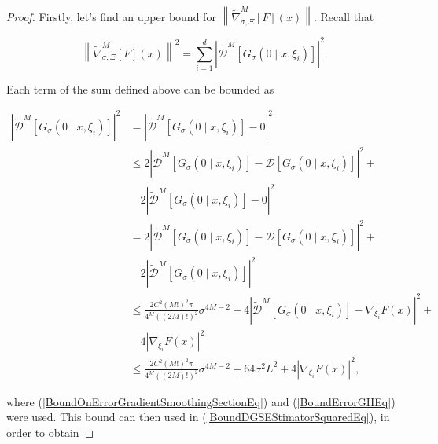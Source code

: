 \begin{proof}

Firstly, let's find an upper bound for $\left\|\widetilde{\nabla}_{\sigma, \Xi}^{M}[F](x)\right\|$. Recall that

\begin{equation}\label{BoundDGSEStimatorSquaredEq}
\left\|\widetilde{\nabla}_{\sigma, \Xi}^{M}[F](x)\right\|^{2} = \sum_{i=1}^d \left|\widetilde{\mathcal{D}}^{M}\left[G_{\sigma}\left(0 \mid x, \xi_{i}\right)\right]\right|^{2}.
\end{equation}

Each term of the sum defined above can be bounded as

\begin{equation}\label{BoundOnErrorEstimationGradientSmoothingSectionEq2}
 \begin{aligned}
 \left|\widetilde{\mathcal{D}}^{M}\left[G_{\sigma}\left(0 \mid x, \xi_{i}\right)\right]\right|^{2} 
 & =  \left|\widetilde{\mathcal{D}}^{M}\left[G_{\sigma}\left(0 \mid x, \xi_{i}\right)\right] - 0 \right|^{2} \\
 & \leq  2\left|\widetilde{\mathcal{D}}^{M}\left[G_{\sigma}\left(0 \mid x, \xi_{i}\right)\right] - \mathcal{D}\left[G_{\sigma}\left(0 \mid x, \xi_{i}\right)\right] \right|^{2} + \\ & \quad 2\left|\widetilde{\mathcal{D}}^{M}\left[G_{\sigma}\left(0 \mid x, \xi_{i}\right)\right] - 0 \right|^{2} \\
 & = 2\left|\widetilde{\mathcal{D}}^{M}\left[G_{\sigma}\left(0 \mid x, \xi_{i}\right)\right] - \mathcal{D}\left[G_{\sigma}\left(0 \mid x, \xi_{i}\right)\right] \right|^{2} + \\ & \quad 2\left|\widetilde{\mathcal{D}}^{M}\left[G_{\sigma}\left(0 \mid x, \xi_{i}\right)\right] \right|^{2} \\
 & \leq \frac{2 C^{2}(M !)^{2} \pi}{4^{M}((2 M) !)^{2}} \sigma^{4 M-2} + 4\left|\widetilde{\mathcal{D}}^{M}\left[G_{\sigma}\left(0 \mid x, \xi_{i}\right)\right] - \nabla_{\xi_{i}} F(x) \right|^{2} + \\ & \quad 4\left|\nabla_{\xi_{i}} F(x)\right|^{2} \\
 & \leq \frac{2 C^{2}(M !)^{2} \pi}{4^{M}((2 M) !)^{2}} \sigma^{4 M-2} + 64\sigma^2 L^2 + 4\left|\nabla_{\xi_{i}} F(x)\right|^{2},
 \end{aligned} 
\end{equation}

where (\ref{BoundOnErrorGradientSmoothingSectionEq}) and (\ref{BoundErrorGHEq}) were used. This bound can then used in (\ref{BoundDGSEStimatorSquaredEq}), in order to obtain


\end{proof}
